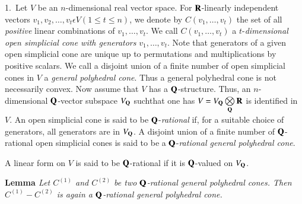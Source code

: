 1.~Let $V$ be an $n$-dimensional real vector space. For $\mathbf{R}$-linearly independent vectors $v_1, v_2, \ldots, v_t \epsilon V (1 \leqslant t \leqslant n)$, we denote by $C (v_1, \ldots, v_t )$  the set of all \textit{positive} linear combinations of $v_1, \ldots, v_t$. We call $C(v_1, \ldots, v_t)$ a $t$-\textit{dimensional open simplicial cone with generators} $v_1, \ldots, v_t$. Note that generators of a given open simplicial cone are unique up to permutations and multiplications by positive scalars. We call a disjoint union of a finite number of open simplicial cones in $V$ a \textit{general polyhedral cone}. Thus a general polyhedral cone is not necessarily convex. Now assume that $V$ has a $\mathbf{Q}$-structure. Thus, an $n$-dimensional $\mathbf{Q}$-vector subspace $V_{\mathbf{Q}}$ such\pageoriginale that one has $V = V_{\mathbf{Q}} \bigotimes\limits_{\mathbf{Q}} \mathbf{R}$ is identified in $V$. An open simplicial cone is said to be $\mathbf{Q}$-\textit{rational} if, for a suitable choice of generators, all generators are in $V_{\mathbf{Q}}$. A disjoint union of a finite number of $\mathbf{Q}$-rational open simplicial cones is said to be a $\mathbf{Q}$-\textit{rational general polyhedral cone}.

A linear form on $V$ is said to be $\mathbf{Q}$-rational if it is $\mathbf{Q}$-valued on $V_{\mathbf{Q}}$.

\medskip
\noindent
{\bfseries Lemma \label{art8-lem1}}
\textit{Let $C^{(1)}$ and $C^{(2)}$ be two $\mathbf{Q}$-rational general polyhedral cones. Then $C^{(1)} - C^{(2)}$ is again a $\mathbf{Q}$-rational general polyhedral cone.}


